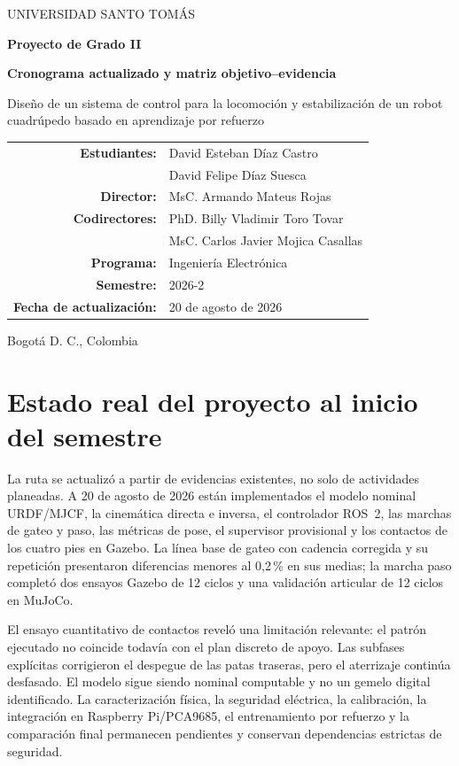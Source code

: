 \documentclass[10pt,letterpaper]{article}
\begin{document}
\begin{titlepage}
\centering
{\large UNIVERSIDAD SANTO TOMÁS\par}
\vspace{1cm}
{\Large\bfseries Proyecto de Grado II\par}
\vspace{0.4cm}
{\LARGE\bfseries Cronograma actualizado y matriz objetivo--evidencia\par}
\vspace{1.2cm}
{\Large Diseño de un sistema de control para la locomoción y estabilización de un robot cuadrúpedo basado en aprendizaje por refuerzo\par}
\vfill
\begin{tabular}{rl}
\textbf{Estudiantes:} & David Esteban Díaz Castro\\
& David Felipe Díaz Suesca\\[4pt]
\textbf{Director:} & MsC. Armando Mateus Rojas\\
\textbf{Codirectores:} & PhD. Billy Vladimir Toro Tovar\\
& MsC. Carlos Javier Mojica Casallas\\[4pt]
\textbf{Programa:} & Ingeniería Electrónica\\
\textbf{Semestre:} & 2026-2\\
\textbf{Fecha de actualización:} & 20 de agosto de 2026
\end{tabular}
\vfill
{Bogotá D. C., Colombia\par}
\end{titlepage}

\section{Estado real del proyecto al inicio del semestre}

La ruta se actualizó a partir de evidencias existentes, no solo de actividades planeadas. A 20 de agosto de 2026 están implementados el modelo nominal URDF/MJCF, la cinemática directa e inversa, el controlador ROS~2, las marchas de gateo y paso, las métricas de pose, el supervisor provisional y los contactos de los cuatro pies en Gazebo. La línea base de gateo con cadencia corregida y su repetición presentaron diferencias menores al 0,2\,\% en sus medias; la marcha paso completó dos ensayos Gazebo de 12 ciclos y una validación articular de 12 ciclos en MuJoCo.

El ensayo cuantitativo de contactos reveló una limitación relevante: el patrón ejecutado no coincide todavía con el plan discreto de apoyo. Las subfases explícitas corrigieron el despegue de las patas traseras, pero el aterrizaje continúa desfasado. El modelo sigue siendo nominal computable y no un gemelo digital identificado. La caracterización física, la seguridad eléctrica, la calibración, la integración en Raspberry Pi/PCA9685, el entrenamiento por refuerzo y la comparación final permanecen pendientes y conservan dependencias estrictas de seguridad.
\end{document}
